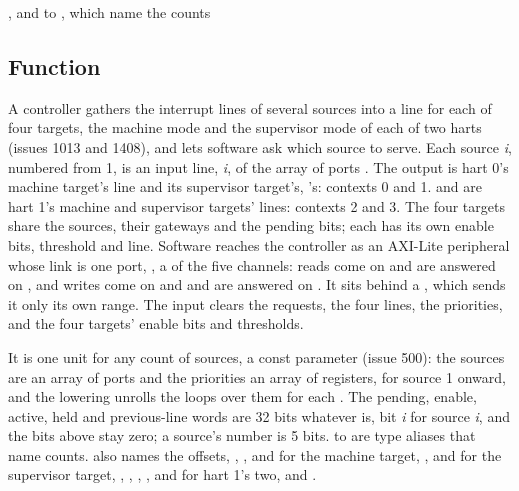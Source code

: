 
%
{, and  to , which name the counts}%
{}

\subsection*{Function}

A controller gathers the interrupt lines of several sources into a
line for each of four targets, the machine mode and the supervisor
mode of each of two harts (issues 1013 and 1408), and lets software
ask which source to serve. Each
source \textit{i}, numbered from 1, is an input line,
\textit{i}, of the array of ports . The
output  is hart 0's machine target's line and  its
supervisor target's, 's: contexts 0 and 1. 
and  are hart 1's machine and supervisor targets' lines:
contexts 2 and 3. The four targets share the
sources, their gateways and the pending bits; each has its own enable
bits, threshold and line. Software reaches the controller as an AXI-Lite
peripheral whose link is one port, , a  of
the five channels: reads come on  and are answered on
, and writes come on  and 
and are answered on . It sits behind a
, which sends it only its own range.
The input  clears the requests, the four lines, the
priorities, and the four targets' enable bits and thresholds.

It is one unit for any count of sources,  a const parameter
(issue 500): the sources are an array of ports and the priorities an
array of registers,  for source 1 onward, and the
lowering unrolls the loops over them for each . The pending,
enable, active, held and previous-line words are 32 bits whatever
 is, bit \textit{i} for source \textit{i}, and the bits above
 stay zero; a source's number is 5 bits.  to
 are type aliases that name counts.  also names the
offsets, , ,  and
 for the machine target, ,
 and  for the supervisor target,
, , , ,
 and  for hart 1's two, and
.

